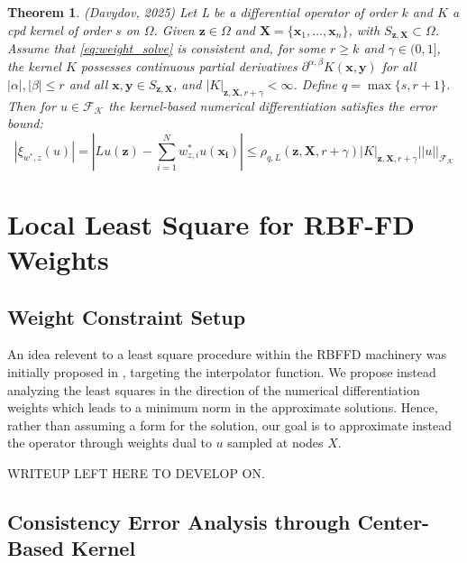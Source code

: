 \documentclass[11pt]{article}
\newtheorem{theorem}{Theorem}
\begin{document}
\begin{theorem}
(Davydov, 2025) Let L be a differential operator of order $k$ and $K$ a cpd kernel of order $s$ on $\Omega$. Given $\bm{z}\in \Omega$ and $\bm{X}=\{ \bm{x}_1, \dots, \bm{x}_n \}$, with $S_{\bm{z},\bm{X}} \subset \Omega$. Assume that \ref{eq:weight_solve} is consistent and, for some $r \ge k$ and $\gamma \in (0,1]$, the kernel $K$ possesses continuous partial derivatives $\partial^{\alpha, \beta}K(\bm{x},\bm{y})$ for all $|\alpha|,|\beta| \le r$ and all $\bm{x},\bm{y} \in S_{\bm{z},\bm{X}}$, and $|K|_{\bm{z},\bm{X},r+\gamma} < \infty$. Define $q=\max\{ s, r+1 \}$. Then for $u \in \mathcal{F_K}$ the kernel-based numerical differentiation satisfies the error bound:
\begin{equation}
\left| \xi_{w^*,z} (u) \right| = \left| Lu(\bm{z}) -\sum_{i=1}^N w_{z,i}^*u(\bm{x_i}) \right| \le \rho_{q, L}(\bm{z}, \bm{X}, r+\gamma) |K|_{\bm{z},\bm{X},r+\gamma} || u ||_{\mathcal{F_K}}
\end{equation}
\end{theorem}

\pagebreak

\section{Local Least Square for RBF-FD Weights}

\subsection{Weight Constraint Setup}

An idea relevent to a least square procedure within the RBFFD machinery was initially proposed in \cite{Shaback2003}, targeting the interpolator function. We propose instead analyzing the least squares in the direction of the numerical differentiation weights which leads to a minimum norm in the approximate solutions. Hence, rather than assuming a form for the solution, our goal is to approximate instead the operator through weights dual to $u$ sampled at nodes $X$. 

WRITEUP LEFT HERE TO DEVELOP ON.

\subsection{Consistency Error Analysis through Center-Based Kernel}
\end{document}
